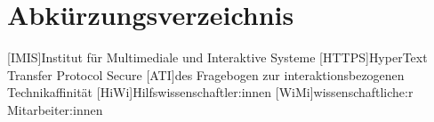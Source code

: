 
\cleardoublepage
{}
{}
\chapter*{Abkürzungsverzeichnis}
\label{section-abbrevs}



\begin{acronym}[CoLab]
  [IMIS]{Institut für Multimediale und Interaktive Systeme}
  [HTTPS]{HyperText Transfer Protocol Secure}
  [ATI]{des Fragebogen zur interaktionsbezogenen Technikaffinität}
  [HiWi]{Hilfswissenschaftler:innen}
  [WiMi]{wissenschaftliche:r Mitarbeiter:innen}
\end{acronym}
